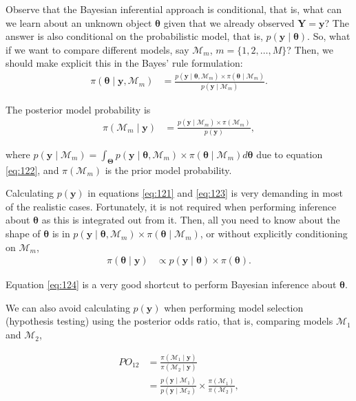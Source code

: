 Observe that the Bayesian inferential approach is conditional, that is, what can we learn about an unknown object \(\bm{\theta}\) given that we already observed \(\bm Y =\mathbf{y}\)? The answer is also conditional on the probabilistic model, that is, \(p(\mathbf{y} \mid \bm{\theta})\). So, what if we want to compare different models, say \(\mathcal{M}_m\), \(m = \{1,2,\dots,M\}\)? Then, we should make explicit this in the Bayes' rule formulation:
\begin{align}
	\pi(\bm{\theta}\mid \mathbf{y},\mathcal{M}_m)&=\frac{p(\mathbf{y}\mid \bm{\theta},\mathcal{M}_m) \times \pi(\bm{\theta}\mid \mathcal{M}_m)}{p(\mathbf{y}\mid \mathcal{M}_m)}.
	\label{eq:122}
\end{align}

The posterior model probability is
\begin{align}
	\pi(\mathcal{M}_m\mid \mathbf{y})&=\frac{p(\mathbf{y}\mid \mathcal{M}_m) \times \pi(\mathcal{M}_m)}{p(\mathbf{y})}, 
	\label{eq:123}
\end{align}

where $p(\mathbf{y}\mid \mathcal{M}_m)=\int_{\mathbf{\Theta}}p(\mathbf{y}\mid \bm{\theta},\mathcal{M}_m) \times \pi(\bm{\theta}\mid \mathcal{M}_m)d\bm{\theta}$ due to equation \ref{eq:122}, and $\pi(\mathcal{M}_m)$ is the prior model probability. 

Calculating \( p(\mathbf{y}) \) in equations \ref{eq:121} and \ref{eq:123} is very demanding in most of the realistic cases. Fortunately, it is not required when performing inference about \( \bm{\theta} \) as this is integrated out from it. Then, all you need to know about the shape of \( \bm{\theta} \) is in \( p(\mathbf{y} \mid \bm{\theta}, \mathcal{M}_m) \times \pi(\bm{\theta} \mid \mathcal{M}_m) \), or without explicitly conditioning on \( \mathcal{M}_m \),
\begin{align}
	\pi(\bm{\theta}\mid \mathbf{y})& \propto p(\mathbf{y}\mid \bm{\theta}) \times \pi(\bm{\theta}).
	\label{eq:124}
\end{align}

Equation \ref{eq:124} is a very good shortcut to perform Bayesian inference about \( \bm{\theta} \).

We can also avoid calculating \( p(\mathbf{y}) \) when performing model selection (hypothesis testing) using the posterior odds ratio, that is, comparing models \( \mathcal{M}_1 \) and \( \mathcal{M}_2 \),

\begin{align}
	PO_{12}&=\frac{\pi(\mathcal{M}_1\mid \mathbf{y})}{\pi(\mathcal{M}_2\mid \mathbf{y})} \nonumber \\
	&=\frac{p(\mathbf{y}\mid \mathcal{M}_1)}{p(\mathbf{y}\mid \mathcal{M}_2)}\times\frac{\pi(\mathcal{M}_1)}{\pi(\mathcal{M}_2)},
	\label{eq:125}
\end{align}

